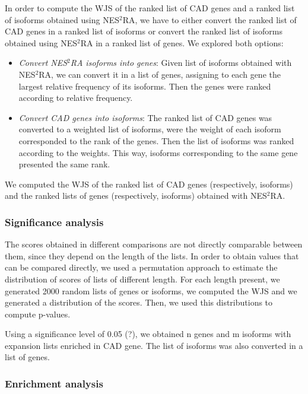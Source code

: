 \documentclass[fleqn,10pt]{SelfArx} %
\begin{document}
In order to compute the WJS of the ranked list of CAD genes and a ranked list of isoforms obtained using NES$^2$RA, we have to either convert the ranked list of CAD genes in a ranked list of isoforms or convert the ranked list of isoforms obtained using NES$^2$RA in a ranked list of genes. We explored both options:

\begin{itemize}[leftmargin=*]
	\item \textit{Convert NES$^2$RA isoforms into genes}: Given list of isoforms obtained with NES$^2$RA, we can convert it in a list of genes, assigning to each gene the largest relative frequency of its isoforms. Then the genes were ranked according to relative frequency.
	\item \textit{Convert CAD genes into isoforms}: The ranked list of CAD genes was converted to a weighted list of isoforms, were the weight of each isoform corresponded to the rank of the genes. Then the list of isoforms was ranked according to the weights. This way, isoforms corresponding to the same gene presented the same rank.
\end{itemize}

We computed the WJS of the ranked list of CAD genes (respectively, isoforms) and the ranked lists of genes (respectively, isoforms) obtained with NES$^2$RA.

\subsubsection{Significance analysis} 

The scores obtained in different comparisons are not directly comparable between them, since they depend on the length of the lists. In order to obtain values that can be compared directly, we used a permutation approach to estimate the distribution of scores of lists of different length. For each length present, we generated 2000 random lists of genes or isoforms, we computed the WJS and we generated a distribution of the scores. Then, we used this distributions to compute p-values.

Using a significance level of 0.05 (?), we obtained n genes and m isoforms with expansion lists enriched in CAD gene. The list of isoforms was also converted in a list of genes.

\subsubsection{Enrichment analysis}
\end{document}
